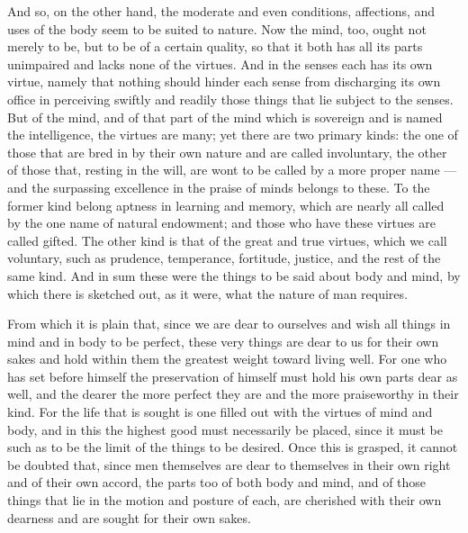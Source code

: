  And so, on the other hand, the moderate and even conditions, affections, and uses of the body seem to be suited to nature. Now the mind, too, ought not merely to be, but to be of a certain quality, so that it both has all its parts unimpaired and lacks none of the virtues. And in the senses each has its own virtue, namely that nothing should hinder each sense from discharging its own office in perceiving swiftly and readily those things that lie subject to the senses. But of the mind, and of that part of the mind which is sovereign and is named the intelligence, the virtues are many; yet there are two primary kinds: the one of those that are bred in by their own nature and are called involuntary, the other of those that, resting in the will, are wont to be called by a more proper name — and the surpassing excellence in the praise of minds belongs to these. To the former kind belong aptness in learning and memory, which are nearly all called by the one name of natural endowment; and those who have these virtues are called gifted. The other kind is that of the great and true virtues, which we call voluntary, such as prudence, temperance, fortitude, justice, and the rest of the same kind. And in sum these were the things to be said about body and mind, by which there is sketched out, as it were, what the nature of man requires.

 From which it is plain that, since we are dear to ourselves and wish all things in mind and in body to be perfect, these very things are dear to us for their own sakes and hold within them the greatest weight toward living well. For one who has set before himself the preservation of himself must hold his own parts dear as well, and the dearer the more perfect they are and the more praiseworthy in their kind. For the life that is sought is one filled out with the virtues of mind and body, and in this the highest good must necessarily be placed, since it must be such as to be the limit of the things to be desired. Once this is grasped, it cannot be doubted that, since men themselves are dear to themselves in their own right and of their own accord, the parts too of both body and mind, and of those things that lie in the motion and posture of each, are cherished with their own dearness and are sought for their own sakes.

